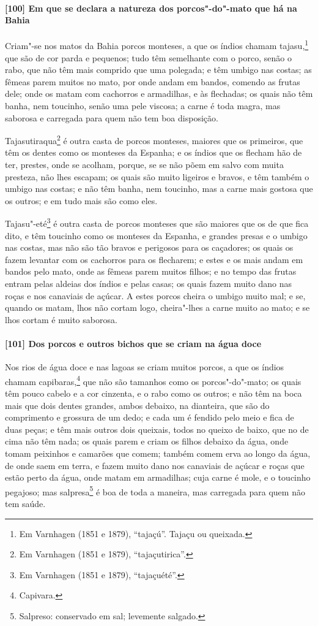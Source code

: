 \begin{linenumbers}
\paragraph{[100] Em que se declara a natureza dos porcos"-do"-mato que há na Bahia}\quad
Criam"-se nos matos da Bahia porcos monteses, a que os índios chamam tajasu,\footnote{ Em
Varnhagen (1851 e 1879), ``tajaçú''. Tajaçu ou queixada.} que são de cor parda e
pequenos; tudo têm semelhante com o porco, senão o rabo, que não têm mais comprido que uma
polegada; e têm umbigo nas costas; as fêmeas parem muitos no mato, por onde andam em
bandos, comendo as frutas dele; onde os matam com cachorros e armadilhas, e às flechadas;
os quais não têm banha, nem toucinho, senão uma pele viscosa; a carne é toda magra, mas
saborosa e carregada para quem não tem boa disposição.

Tajasutiraqua\footnote{ Em Varnhagen (1851 e 1879), ``tajaçutirica''.} é outra casta de
porcos monteses, maiores que os primeiros, que têm os dentes como os monteses da Espanha;
e os índios que os flecham hão de ter, prestes, onde se acolham, porque, se se não põem em
salvo com muita presteza, não lhes escapam; os quais são muito ligeiros e bravos, e têm
também o umbigo nas costas; e não têm banha, nem toucinho, mas a carne mais gostosa que os
outros; e em tudo mais são como eles.

Tajasu"-eté\footnote{ Em Varnhagen (1851 e 1879), ``tajaçuété''.} é outra casta de porcos
monteses que são maiores que os de que fica dito, e têm toucinho como os monteses da
Espanha, e grandes presas e o umbigo nas costas, mas não são tão bravos e perigosos para
os caçadores; os quais os fazem levantar com os cachorros para os flecharem; e estes e os
mais andam em bandos pelo mato, onde as fêmeas parem muitos filhos; e no tempo das frutas
entram pelas aldeias dos índios e pelas casas; os quais fazem muito
dano nas roças e nos canaviais de açúcar. A estes porcos cheira o umbigo muito mal; e se,
quando os matam, lhos não cortam logo, cheira"-lhes a carne muito ao mato; e se lhos cortam
é muito saborosa.

\paragraph{[101] Dos porcos e outros bichos que se criam na água doce}\quad
Nos rios de água doce e nas lagoas se criam muitos porcos, a que os índios chamam
capibaras,\footnote{ Capivara.} que não são tamanhos como os porcos"-do"-mato; os quais têm
pouco cabelo e a cor cinzenta, e o rabo como os outros; e não têm na boca mais que dois
dentes grandes, ambos debaixo, na dianteira, que são do comprimento e grossura de um dedo;
e cada um é fendido pelo meio e fica de duas peças; e têm mais outros dois queixais, todos
no queixo de baixo, que no de cima não têm nada; os quais parem e criam os filhos debaixo
da água, onde tomam peixinhos e camarões que comem; também comem erva ao longo da água, de
onde saem em terra, e fazem muito dano nos canaviais de açúcar e roças que estão perto da
água, onde matam em armadilhas; cuja carne é mole, e o toucinho pegajoso; mas
salpresa\footnote{ Salpreso: conservado em sal; levemente salgado.} é boa de toda a
maneira, mas carregada para quem não tem saúde.


\end{linenumbers}
